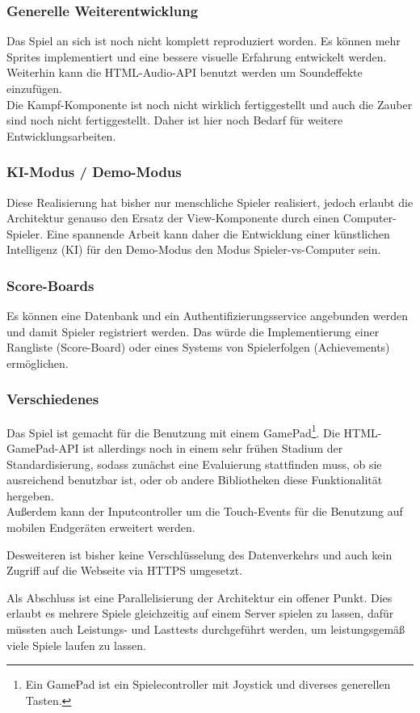 \subsubsection{Generelle Weiterentwicklung}

Das Spiel an sich ist noch nicht komplett reproduziert worden. Es können mehr Sprites implementiert und eine bessere visuelle Erfahrung entwickelt werden.\\
Weiterhin kann die HTML-Audio-API benutzt werden um Soundeffekte einzufügen.\\
Die Kampf-Komponente ist noch nicht wirklich fertiggestellt und auch die Zauber sind noch nicht fertiggestellt. Daher ist hier noch Bedarf für weitere Entwicklungsarbeiten.

\subsubsection{KI-Modus / Demo-Modus}

Diese Realisierung hat bisher nur menschliche Spieler realisiert, jedoch erlaubt die Architektur genauso den Ersatz der View-Komponente durch einen Computer-Spieler. Eine spannende Arbeit kann daher die Entwicklung einer künstlichen Intelligenz (KI) für den Demo-Modus \bzw den Modus Spieler-vs-Computer sein.

\subsubsection{Score-Boards}

Es können eine Datenbank und ein Authentifizierungsservice angebunden werden und damit Spieler registriert werden. Das würde die Implementierung einer Rangliste (Score-Board) oder eines Systems von Spielerfolgen (Achievements) ermöglichen.

\subsubsection{Verschiedenes}

Das Spiel ist gemacht für die Benutzung mit einem GamePad\footnote{Ein GamePad ist ein Spielecontroller mit Joystick und diverses generellen Tasten.}. Die HTML-GamePad-API ist allerdings noch in einem sehr frühen Stadium der Standardisierung, sodass zunächst eine Evaluierung stattfinden muss, ob sie ausreichend benutzbar ist, oder ob andere Bibliotheken diese Funktionalität hergeben.\\
Außerdem kann der Inputcontroller um die Touch-Events für die Benutzung auf mobilen Endgeräten erweitert werden.

Desweiteren ist bisher keine Verschlüsselung des Datenverkehrs und auch kein Zugriff auf die Webseite via HTTPS umgesetzt.

Als Abschluss ist eine Parallelisierung der Architektur ein offener Punkt. Dies erlaubt es mehrere Spiele gleichzeitig auf einem Server spielen zu lassen, dafür müssten auch Leistungs- und Lasttests durchgeführt werden, um leistungsgemäß viele Spiele laufen zu lassen.